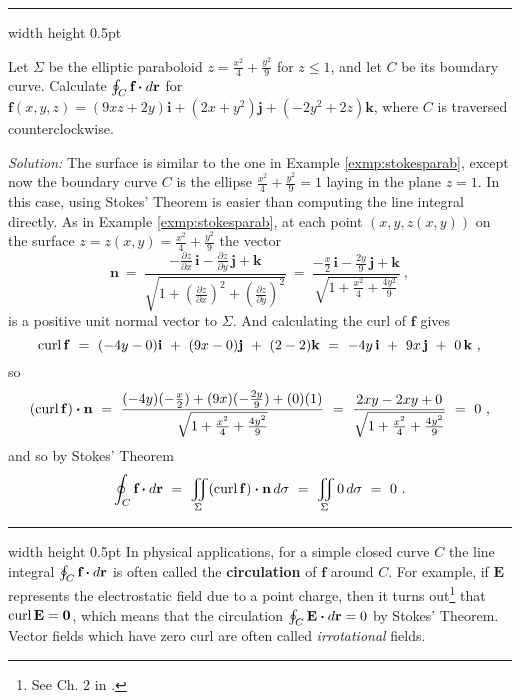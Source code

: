 \medskip
\hrule width \textwidth height 0.5pt
\begin{exmp}
 Let $\Sigma$ be the elliptic paraboloid $z=\frac{x^2}{4}+\frac{y^2}{9}$ for $z \le 1$, and let $C$ be its boundary
 curve.
 Calculate $\oint_{C} \textbf{f} \bm{\cdot} d\textbf{r}$ for $\mathbf{f}(x,y,z)=(9xz+2y)\mathbf{i}+(2x+y^2 )\mathbf{j}+(-2y^2 +2z)\mathbf{k}$,
 where $C$ is traversed counterclockwise.\smallskip
 \par\noindent\emph{Solution:} The surface is similar to the one in Example \ref{exmp:stokesparab}, except now the
 boundary curve $C$ is the ellipse $\frac{x^2}{4}+\frac{y^2}{9}=1$ laying in the plane $z=1$. 
 In this case, using Stokes' Theorem is easier than computing the line integral directly. 
 As in Example \ref{exmp:stokesparab}, at each
 point $(x,y,z(x,y))$ on the surface $z=z(x,y)=\frac{x^2}{4}+\frac{y^2}{9}$ the vector
 \begin{displaymath}
  \mathbf{n} ~=~
   \frac{-\frac{\partial z}{\partial x}\,\mathbf{i} - \frac{\partial z}{\partial y}\,\mathbf{j} +
   \mathbf{k}}{\sqrt{1 + \left( \tfrac{\partial z}{\partial x} \right)^2 +
   \left( \tfrac{\partial z}{\partial y} \right)^2}} ~=~
   \frac{-\tfrac{x}{2}\,\mathbf{i} - \tfrac{2y}{9}\,\mathbf{j} + \mathbf{k}}{\sqrt{1 +\tfrac{x^2}{4}+
    \tfrac{4y^2}{9}}} ~,
 \end{displaymath}
 is a positive unit normal vector to $\Sigma$. 
And calculating the curl of $\mathbf{f}$ gives
 \begin{displaymath}
  \mathop{\mathrm{curl}}\nolimits\mathbf{f} ~=~ (-4y-0)\mathbf{i} ~+~ (9x-0)\mathbf{j} ~+~ (2-2)\mathbf{k} ~=~ -4y\,\mathbf{i} ~+~ 9x\,\mathbf{j} ~+~
   0\,\mathbf{k}~,
 \end{displaymath}
 so
 \begin{displaymath}
  (\mathop{\mathrm{curl}}\nolimits\mathbf{f}) \bm{\cdot} \mathbf{n} ~=~ \frac{(-4y)(-\tfrac{x}{2})+(9x)(-\tfrac{2y}{9})+
   (0)(1)}{\sqrt{1 +\tfrac{x^2}{4}+\tfrac{4y^2}{9}}} ~=~ \frac{2xy-2xy+0}{\sqrt{1 +\tfrac{x^2}{4}+\tfrac{4y^2}{9}}} ~=~ 0~,
 \end{displaymath}
 and so by Stokes' Theorem
 \begin{displaymath}
  \oint_{C} \textbf{f} \bm{\cdot} d\textbf{r} ~=~ \iint\limits_{\Sigma} (\mathop{\mathrm{curl}}\nolimits\mathbf{f}) \bm{\cdot} \mathbf{n}\,d\sigma ~=~
   \iint\limits_{\Sigma} 0\,d\sigma ~=~ 0 ~.
 \end{displaymath}
\end{exmp}
\hrule width \textwidth height 0.5pt
\smallskip
In physical applications, for a simple closed curve $C$ the line integral $\oint_{C} \textbf{f} \bm{\cdot} d\textbf{r}$
is often called the \textbf{circulation} of $\mathbf{f}$ around $C$. For example, if $\mathbf{E}$
represents the electrostatic field due to a point charge, then
it turns out\footnote{See Ch. 2 in \cite{rmc}.} that $\mathop{\mathrm{curl}}\nolimits\mathbf{E} = \mathbf{0}$, which means that the
circulation $\oint_{C} \textbf{E} \bm{\cdot} d\textbf{r}=0$ by Stokes' Theorem. Vector fields which have zero curl are often called
\emph{irrotational} fields.

